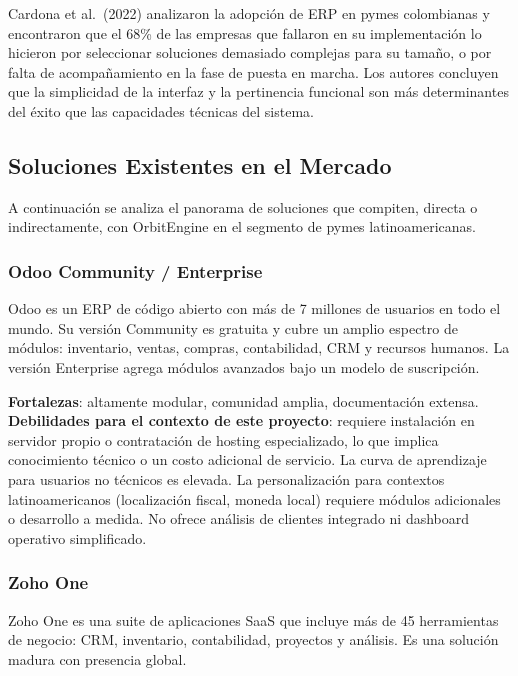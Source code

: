 Cardona et al.~(2022) analizaron la adopción de ERP en pymes colombianas y encontraron que el 68\% de las empresas que fallaron en su implementación lo hicieron por seleccionar soluciones demasiado complejas para su tamaño, o por falta de acompañamiento en la fase de puesta en marcha. Los autores concluyen que la simplicidad de la interfaz y la pertinencia funcional son más determinantes del éxito que las capacidades técnicas del sistema.

\subsection{Soluciones Existentes en el Mercado}\label{soluciones-existentes-en-el-mercado}

A continuación se analiza el panorama de soluciones que compiten, directa o indirectamente, con OrbitEngine en el segmento de pymes latinoamericanas.

\subsubsection{Odoo Community / Enterprise}\label{odoo-community-enterprise}

Odoo es un ERP de código abierto con más de 7 millones de usuarios en todo el mundo. Su versión Community es gratuita y cubre un amplio espectro de módulos: inventario, ventas, compras, contabilidad, CRM y recursos humanos. La versión Enterprise agrega módulos avanzados bajo un modelo de suscripción.

\textbf{Fortalezas}: altamente modular, comunidad amplia, documentación extensa.\\
\textbf{Debilidades para el contexto de este proyecto}: requiere instalación en servidor propio o contratación de hosting especializado, lo que implica conocimiento técnico o un costo adicional de servicio. La curva de aprendizaje para usuarios no técnicos es elevada. La personalización para contextos latinoamericanos (localización fiscal, moneda local) requiere módulos adicionales o desarrollo a medida. No ofrece análisis de clientes integrado ni dashboard operativo simplificado.

\subsubsection{Zoho One}\label{zoho-one}

Zoho One es una suite de aplicaciones SaaS que incluye más de 45 herramientas de negocio: CRM, inventario, contabilidad, proyectos y análisis. Es una solución madura con presencia global.

